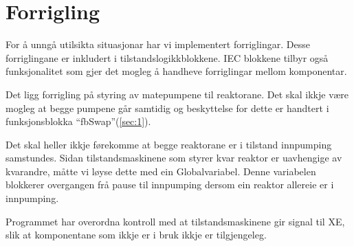 \section{Forrigling}
\thispagestyle{fancy}

For å unngå utilsikta situasjonar har vi implementert forriglingar.
Desse forriglingane er inkludert i tilstandslogikkblokkene.\newline
\gls{IEC} blokkene tilbyr også funksjonalitet som gjer det mogleg å handheve forriglingar mellom komponentar.

Det ligg forrigling på styring av matepumpene til reaktorane. Det skal ikkje være mogleg at begge pumpene går samtidig
og beskyttelse for dette er handtert i funksjonsblokka ``fbSwap''(\ref{sec:1}).

Det skal heller ikkje førekomme at begge reaktorane er i tilstand innpumping samstundes.
Sidan tilstandsmaskinene som styrer kvar reaktor er uavhengige av kvarandre, måtte vi løyse dette med ein
\gls{Globalvariabel}. Denne variabelen blokkerer overgangen frå pause til innpumping dersom ein reaktor allereie er i innpumping.

Programmet har overordna kontroll med at tilstandsmaskinene gir signal til XE, 
slik at komponentane som ikkje er i bruk ikkje er tilgjengeleg.

\newpage






